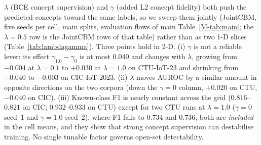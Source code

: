 \documentclass[journal]{IEEEtran}
\begin{document}
$\lambda$ (BCE concept supervision) and $\gamma$ (added L2 concept fidelity) both push the
predicted concepts toward the same labels, so we sweep them jointly (JointCBM, five seeds per
cell, main splits, evaluation flows of main Table~\ref{M-tab:main}; the $\lambda{=}0.5$ row is the
JointCBM rows of that table) rather than as two 1-D slices (Table~\ref{tab:lambdagamma}). Three
points hold in 2-D. (i) $\gamma$ is not a reliable lever: its effect $\gamma_{1.0}{-}\gamma_0$ is at
most $0.040$ and changes with $\lambda$, growing from $-0.004$ at $\lambda{=}0.1$ to $+0.030$ at
$\lambda{=}1.0$ on CTU-IoT-23 and shrinking from $-0.040$ to $-0.003$ on CIC-IoT-2023. (ii) $\lambda$
moves AUROC by a similar amount in opposite directions on the two corpora (down the $\gamma{=}0$
column, $+0.020$ on CTU, $-0.040$ on CIC). (iii) Known-class F1 is nearly constant across the grid
($0.816$--$0.821$ on CIC; $0.932$--$0.933$ on CTU) except for two CTU runs at $\lambda{=}1.0$
($\gamma{=}0$ seed~1 and $\gamma{=}1.0$ seed~2), where F1 falls to $0.734$ and $0.736$; both are
\emph{included} in the cell means, and they show that strong concept supervision can destabilise
training. No single tunable factor governs open-set detectability.

\begin{table}[!htb]
\centering\small
\caption{Joint $(\lambda,\gamma)$ sweep: JointCBM OOD AUROC on the main splits (mean over five
seeds; std in parentheses), $\lambda$ down rows, $\gamma$ across columns; F1 and concept accuracy
(Conc.) at $\gamma{=}0$. The $\gamma{=}0$ column is the $\lambda$ sensitivity, and the $\lambda{=}0.5$
row is the JointCBM rows of main Table~\ref{M-tab:main}.}
\label{tab:lambdagamma}
\setlength{\tabcolsep}{3pt}
\end{table}
\end{document}
